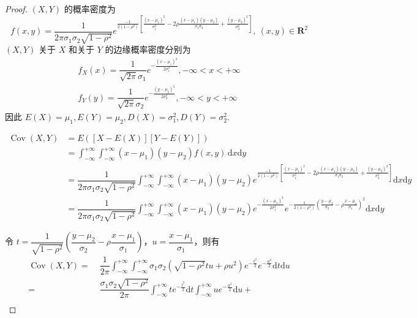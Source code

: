 \begin{proof}
    $(X,Y)$ 的概率密度为
    $$
    f(x,y) = \dfrac{1}{2 \pi \sigma_1 \sigma_2 \sqrt{1-\rho^2}} e^{\frac{-1}{2(1-\rho^2)} \left[ \frac{(x-\mu_1)^2}{\sigma_1^2} - 2 \rho \frac{(x-\mu_1)(y-\mu_2)}{\sigma_1 \sigma_2} + \frac{(y-\mu_2)^2}{\sigma_2^2} \right]},\ (x,y)\in \mathbf{R}^2
    $$
    $(X,Y)$ 关于 $X$ 和关于 $Y$ 的边缘概率密度分别为
    \begin{gather*}
        f_{X}(x) = \dfrac{1}{\sqrt{2\pi} \sigma_1} e^{-\frac{(x-\mu_1)^2}{2 \sigma_1^2}}, -\infty < x < +\infty \\
        f_{Y}(y) = \dfrac{1}{\sqrt{2\pi} \sigma_2} e^{-\frac{(y-\mu_2)^2}{2 \sigma_2^2}}, -\infty < y < +\infty
    \end{gather*}
    因此 $E(X) = \mu_1, E(Y) = \mu_2, D(X) = \sigma_1^2, D(Y) = \sigma_2^2$.
    \begin{small}
    $$
    \begin{aligned}
        \operatorname{Cov}(X,Y) &= E([X-E(X)][Y-E(Y)]) \\
        &= \int_{-\infty}^{+\infty} \int_{-\infty}^{+\infty} (x-\mu_1)(y-\mu_2) f(x,y) \, \text{d}x \text{d}y \\
        &= \dfrac{1}{2 \pi \sigma_1 \sigma_2 \sqrt{1-\rho^2}} \int_{-\infty}^{+\infty} \int_{-\infty}^{+\infty} (x-\mu_1)(y-\mu_2) e^{\frac{-1}{2(1-\rho^2)} \left[ \frac{(x-\mu_1)^2}{\sigma_1^2} - 2 \rho \frac{(x-\mu_1)(y-\mu_2)}{\sigma_1 \sigma_2} + \frac{(y-\mu_2)^2}{\sigma_2^2} \right]} \text{d}x \text{d}y \\
        &= \dfrac{1}{2 \pi \sigma_1 \sigma_2 \sqrt{1-\rho^2}} \int_{-\infty}^{+\infty} \int_{-\infty}^{+\infty} (x-\mu_1)(y-\mu_2) e^{-\frac{(x-\mu_1)^2}{2 \sigma_1^2}} e^{-\frac{1}{2(1-\rho^2)} \left( \frac{y-\mu_2}{\sigma_2} - \rho \frac{x-\mu_1}{\sigma_1} \right)^2} \text{d}x \text{d}y
    \end{aligned}
    $$
    \end{small}
    令 $t = \dfrac{1}{\sqrt{1-\rho^2}} \left( \dfrac{y-\mu_2}{\sigma_2} - \rho \dfrac{x-\mu_1}{\sigma_1} \right)$，$u = \dfrac{x-\mu_1}{\sigma_1}$，则有
    $$
    \begin{aligned}
        \operatorname{Cov}(X,Y) = & \; \dfrac{1}{2 \pi} \int_{-\infty}^{+\infty} \int_{-\infty}^{+\infty} \sigma_1 \sigma_2 (\sqrt{1-\rho^2} tu + \rho u^2) e^{-\frac{t^2}{2}} e^{-\frac{u^2}{2}} \text{d}t \text{d}u \\
        = & \; \dfrac{\sigma_1 \sigma_2 \sqrt{1-\rho^2}}{2 \pi} \int_{-\infty}^{+\infty} t e^{-\frac{t^2}{2}} \text{d}t \int_{-\infty}^{+\infty} u e^{-\frac{u^2}{2}} \text{d}u + \\

\end{aligned}$$
\end{proof}
